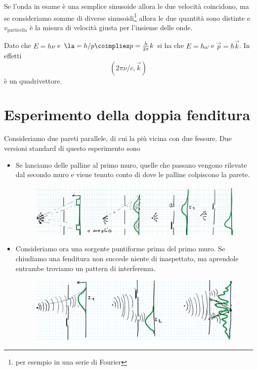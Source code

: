 \noindent
Se l'onda in esame \`e una semplice sinusoide allora le due velocit\`a coincidono, ma se consideriamo somme di diverse sinusoidi\footnote{per esempio in una serie di Fourier} allora le due quantit\`a sono distinte e $v_{\text{particella}}$ \`e la misura di velocit\`a giusta per l'insieme delle onde.

\begin{remark}
Dato che $E=h\nu$ e $\la=h/p\coimplies p=\frac h{2\pi}k$ si ha che $E=\hbar\omega$ e $\vec p=\hbar \vec k$. In effetti
\[(2\pi\nu/c,\vec k)\]
\`e un quadrivettore.
\end{remark}


\section{Esperimento della doppia fenditura}
Consideriamo due pareti parallele, di cui la pi\`u vicina con due fessure. Due versioni standard di questo esperimento sono

\begin{itemize}
\item Se lanciamo delle palline al primo muro, quelle che passano vengono rilevate dal secondo muro e viene tenuto conto di dove le palline colpiscono la parete. 

\begin{figure}[!htb]
    \centering
    \includegraphics[width=11cm]{images/Double_slit_palline.png}
\end{figure}

\item Consideriamo ora una sorgente puntiforme prima del primo muro. Se chiudiamo una fenditura non succede niente di inaspettato, ma aprendole entrambe troviamo un pattern di interferenza.

\begin{figure}[!htb]
    \centering
    \includegraphics[width=11cm]{images/double_slit_onda.png}
\end{figure}
\end{itemize}


